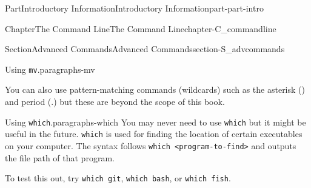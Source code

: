 \documentclass[twoside,10pt,]{book}
\newcommand{\mono}[1]{\texttt{#1}}
\begin{document}
\begin{partptx}{Part}{Introductory Information}{}{Introductory Information}{}{}{part-part-intro}
\begin{chapterptx}{Chapter}{The Command Line}{}{The Command Line}{}{}{chapter-C_commandline}
\begin{sectionptx}{Section}{Advanced Commands}{}{Advanced Commands}{}{}{section-S_advcommands}
\begin{paragraphs}{Using \mono{mv}.}{paragraphs-mv}
%
\par
You can also use pattern-matching commands (wildcards) such as the asterisk (\textasteriskcentered{}) and period (.) but these are beyond the scope of this book.%
\end{paragraphs}%
\begin{paragraphs}{Using \mono{which}.}{paragraphs-which}%
%
%
You may never need to use \mono{which} but it might be useful in the future. \mono{which} is used for finding the location of certain executables on your computer. The syntax follows \mono{which <program-to-find>} and outputs the file path of that program.%
\par
To test this out, try \mono{which git}, \mono{which bash}, or \mono{which fish}.%
\end{paragraphs}%
\end{sectionptx}
\end{chapterptx}
\end{partptx}
%
%
\typeout{************************************************}
\typeout{************************************************}
%
\end{document}
